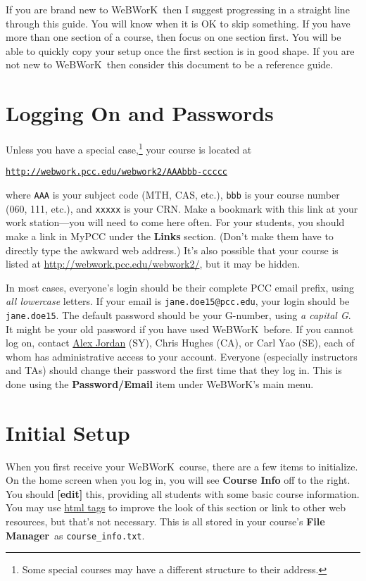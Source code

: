 \documentclass[12pt]{article}
\newcommand{\menu}[1]{\textbf{#1}}
\newcommand{\WW}{WeBWorK}
\newcommand{\FM}{\menu{File Manager}}
\begin{document}
If you are brand new to \WW\, then I suggest progressing in a straight line through this guide. You will know when it is OK to skip something. If you have more than one section of a course, then focus on one section first. You will be able to quickly copy your setup once the first section is in good shape. If you are not new to \WW\, then consider this document to be a reference guide.

\section{Logging On and Passwords}

Unless you have a special case,\footnote{Some special courses may have a different structure to their address.} your course is located at \begin{center}\href{http://webwork.pcc.edu/webwork2/}{\texttt{http://webwork.pcc.edu/webwork2/AAAbbb-ccccc}} \end{center} where \texttt{AAA} is your subject code (MTH, CAS, etc.), \texttt{bbb} is your course number (060, 111, etc.),  and \texttt{xxxxx} is your CRN. Make a bookmark with this link at your work station---you will need to come here often. For your students, you should make a link in MyPCC under the \menu{Links} section. (Don't make them have to directly type the awkward web address.) It's also possible that your course is listed at \href{http://webwork.pcc.edu/webwork2/}{http://webwork.pcc.edu/webwork2/}, but it may be hidden.

In most cases, everyone's login should be their complete PCC email prefix, using \emph{all lowercase} letters.  If your email is \texttt{jane.doe15@pcc.edu}, your login should be \texttt{jane.doe15}.  The default password should be your G-number, using \emph{a capital G}.  It might be your old password if you have used \WW\ before.  If you cannot log on, contact \href{mailto:alex.jordan@pcc.edu}{Alex Jordan} (SY), Chris Hughes (CA), or Carl Yao (SE), each of whom has administrative access to your account.  Everyone (especially instructors and TAs) should change their password the first time that they log in.  This is done using the \menu{Password/Email} item under \WW's main menu.


\section{Initial Setup}
When you first receive your \WW\ course, there are a few items to initialize.  On the home screen when you log in, you will see \menu{Course Info} off to the right.  You should \menu{[edit]} this, providing all students with some basic course information.  You may use \href{http://en.wikipedia.org/wiki/HTML_element}{html tags} to improve the look of this section or link to other web resources, but that's not necessary.  This is all stored in your course's \FM\  as \verb=course_info.txt=. 
\end{document}
